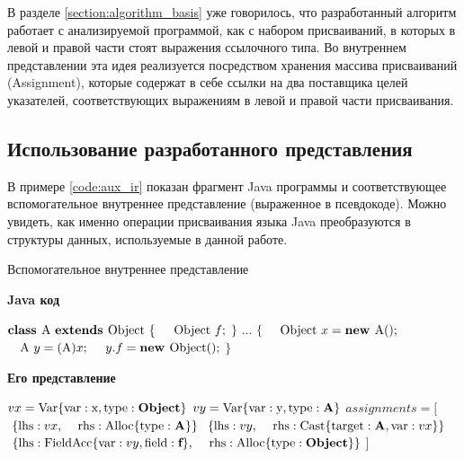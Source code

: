 \documentclass[14pt,titlepage]{extarticle}
\newcommand{\algorithmictitle}[1]{\hspace{8mm}\textbf{#1}}
\newcommand{\eng}[1]{{\English#1}}
\newcommand{\java}{\eng{Java}\xspace}
\begin{document}
      В разделе \ref{section:algorithm_basis} уже говорилось, что разработанный
      алгоритм работает с анализируемой программой, как с набором присваиваний,
      в которых в левой и правой части стоят выражения ссылочного типа. Во
      внутреннем представлении эта идея реализуется посредством хранения
      массива присваиваний (\eng{Assignment}), которые содержат в себе ссылки
      на два поставщика целей указателей, соответствующих выражениям в левой и
      правой части присваивания.

    \subsection{Использование разработанного представления}

      В примере \ref{code:aux_ir} показан фрагмент \java программы и
      соответствующее вспомогательное внутреннее представление (выраженное в
      псевдокоде).
      Можно увидеть, как именно операции присваивания языка \java преобразуются
      в структуры данных, используемые в данной работе.

      \begin{algorithm}
        \caption{Вспомогательное внутреннее представление}
        \label{code:aux_ir}
        \begin{multicols}{2}
          \algorithmictitle{\java код}
          \begin{algorithmic}
            \STATE $\textbf{class }\textmd{A }%
                    \textbf{extends }\textmd{Object }\{$
            \STATE $\textmd{\quad Object }f;$
            \STATE $\}$
            \STATE $\ldots$
            \STATE $\{$
            \STATE $\textmd{\quad Object }x = \textbf{new }\textmd{A}();$
            \STATE $\textmd{\quad A }y = (\textmd{A})x;$
            \STATE $\textmd{\quad}y.f = \textbf{new }\textmd{Object}();$
            \STATE $\}$
          \end{algorithmic}
          \columnbreak
          \algorithmictitle{Его представление}
          \begin{algorithmic}
            \STATE $vx = \textmd{Var}\{\textmd{var}: \textmd{x},%
                              \textmd{type}: \textbf{Object}\}$
            \STATE $vy = \textmd{Var}\{\textmd{var}: \textmd{y},%
                              \textmd{type}: \textbf{A}\}$
            \STATE $assignments = [$
            \STATE $\textmd{\ }\{ \textmd{lhs}: vx,$
            \STATE $\textmd{\ \, rhs}: \textmd{Alloc}\{\textmd{type}: \textbf{A}\}\}$
            \STATE $\textmd{\ }\{ \textmd{lhs}: vy,$
            \STATE $\textmd{\ \, rhs}: \textmd{Cast}\{\textmd{target}: \textbf{A}, \textmd{var}: vx\}\}$
            \STATE $\textmd{\ }\{ \textmd{lhs}: \textmd{FieldAcc}\{\textmd{var}: vy, \textmd{field}: \textbf{f}\},$
            \STATE $\textmd{\ \, rhs}: \textmd{Alloc}\{\textmd{type}: \textbf{Object}\}\}$
            \STATE $]$
          \end{algorithmic}
        \end{multicols}
      \end{algorithm}
\end{document}
